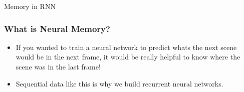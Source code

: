 



\begin{frame}
  \begin{center}
    {\Large Memory in RNN}
  \end{center}
\end{frame}


\begin{frame}[fragile] \frametitle{What is Neural Memory?}

\begin{itemize}
\item If you wanted to train a neural network to predict whats the next scene would be in the next frame, it would be really helpful to know where the scene was in the last frame! 
\item Sequential data like this is why we build recurrent neural networks.
\end{itemize}
\end{frame}

